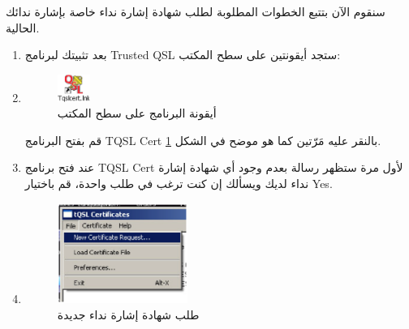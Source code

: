 \documentclass[a4paper,12pt]{article}
\begin{document}
سنقوم الآن بتتبع الخطوات المطلوبة لطلب شهادة إشارة نداء خاصة بإشارة
ندائك الحالية. 
\\


\begin{enumerate}
	\item
		بعد تثبيتك لبرنامج \textenglish{Trusted QSL} ستجد أيقونتين على سطح المكتب:
  \clearpage
	\item
		\begin{figure}[!hbtp]
		\centering
		\includegraphics[width=0.1\textwidth]{tqslcert.eps}
		\caption{أيقونة البرنامج على سطح المكتب}
		\label{fig:Desktop2}
		\end{figure}
	  قم بفتح البرنامج \textenglish{TQSL Cert} بالنقر عليه مَرّتين كما هو موضح في الشكل \ref{fig:Desktop2}.
	\item
		عند فتح برنامج \textenglish{TQSL Cert} لأول مرة ستظهر رسالة بعدم وجود أي شهادة إشارة نداء لديك ويسألك إن كنت ترغب في طلب واحدة، قم باختيار \textenglish{Yes}.
	\item
		\begin{figure}[!hbtp]
		\centering
		\includegraphics[width=0.4\textwidth]{newcsr.eps}
		\caption{طلب شهادة إشارة نداء جديدة}
		\label{fig:New CSR}
		\end{figure}
		

\end{enumerate}
\end{document}
